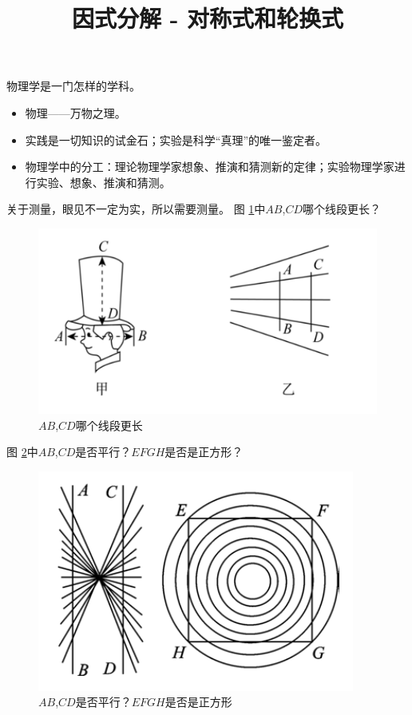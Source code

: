 \documentclass[windows,csize4]{BHCexam}
\title{因式分解 - 对称式和轮换式}
\begin{document}
\maketitle

\begin{groups}
    物理学是一门怎样的学科。
    \begin{itemize}
        \item 物理——万物之理。
        \item 实践是一切知识的试金石；实验是科学“真理”的唯一鉴定者。
        \item 物理学中的分工：理论物理学家想象、推演和猜测新的定律；实验物理学家进行实验、想象、推演和猜测。
    \end{itemize}
    
    关于测量，眼见不一定为实，所以需要测量。
    图 \ref{fig:fig_1_1}中$AB$,$CD$哪个线段更长？
    \begin{figure}[htb]
        \centering
        \includegraphics [scale=0.75,trim=0 0 0 0]{./image/fig_1_1.PNG}
        \caption{$AB$,$CD$哪个线段更长} 
        \label{fig:fig_1_1}
    \end{figure}

    图 \ref{fig:fig_1_2}中$AB$,$CD$是否平行？$EFGH$是否是正方形？
    \begin{figure}[htb]
        \centering
        \includegraphics [scale=0.75,trim=0 0 0 0]{./image/fig_1_2.PNG}
        \caption{$AB$,$CD$是否平行？$EFGH$是否是正方形} 
        \label{fig:fig_1_2}
    \end{figure}




    

\end{groups}





\label{lastpage}
\end{document}
